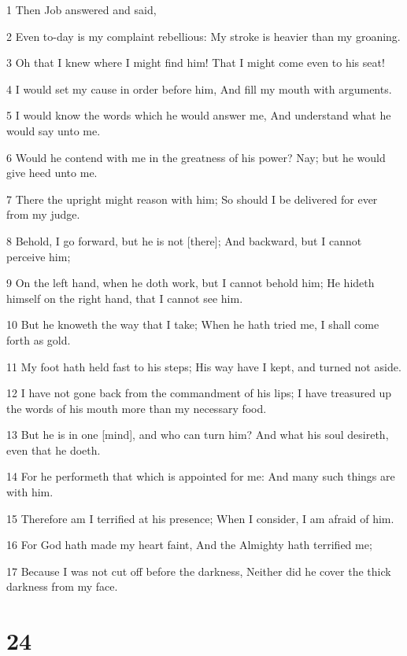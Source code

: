 \par 1 Then Job answered and said,
\par 2 Even to-day is my complaint rebellious: My stroke is heavier than my groaning.
\par 3 Oh that I knew where I might find him! That I might come even to his seat!
\par 4 I would set my cause in order before him, And fill my mouth with arguments.
\par 5 I would know the words which he would answer me, And understand what he would say unto me.
\par 6 Would he contend with me in the greatness of his power? Nay; but he would give heed unto me.
\par 7 There the upright might reason with him; So should I be delivered for ever from my judge.
\par 8 Behold, I go forward, but he is not [there]; And backward, but I cannot perceive him;
\par 9 On the left hand, when he doth work, but I cannot behold him; He hideth himself on the right hand, that I cannot see him.
\par 10 But he knoweth the way that I take; When he hath tried me, I shall come forth as gold.
\par 11 My foot hath held fast to his steps; His way have I kept, and turned not aside.
\par 12 I have not gone back from the commandment of his lips; I have treasured up the words of his mouth more than my necessary food.
\par 13 But he is in one [mind], and who can turn him? And what his soul desireth, even that he doeth.
\par 14 For he performeth that which is appointed for me: And many such things are with him.
\par 15 Therefore am I terrified at his presence; When I consider, I am afraid of him.
\par 16 For God hath made my heart faint, And the Almighty hath terrified me;
\par 17 Because I was not cut off before the darkness, Neither did he cover the thick darkness from my face.

\chapter{24}

